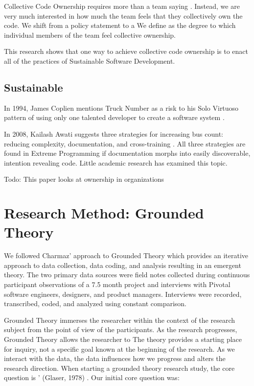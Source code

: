 Collective Code Ownership requires more than a team saying . Instead, we are very much interested in how much the team feels that they collectively own the code. We shift from a policy statement to a  We define  as the degree to which individual members of the team feel collective ownership.  

This research shows that one way to achieve collective code ownership is to enact all of the practices of Sustainable Software Development.

\subsection{Sustainable}

In 1994, James Coplien mentions Truck Number as a risk to his Solo Virtuoso pattern of using only one talented developer to create a software system \cite{Coplien1994}.

In 2008, Kailash Awati suggests three strategies for increasing bus count: reducing complexity, documentation, and cross-training \cite{AwatiBusFactor}. All three strategies are found in Extreme Programming if documentation morphs into easily discoverable, intention revealing code. Little academic research has examined this topic. 


Todo: This paper looks at ownership in organizations \cite{PierceOwnershipInOrganizations}
\section{Research Method: Grounded Theory}
\label{ResearchMethod}

We followed Charmaz' approach to Grounded Theory \cite{Charmaz} which provides an iterative approach to data collection, data coding, and analysis resulting in an emergent theory. The two primary data sources were field notes collected during continuous participant observations of a 7.5 month project and interviews with Pivotal software engineers, designers, and product managers. Interviews were recorded, transcribed, coded, and analyzed using constant comparison. 

Grounded Theory immerses the researcher within the context of the research subject from the point of view of the participants. As the research progresses, Grounded Theory allows the researcher to  The theory provides a starting place for inquiry, not a specific goal known at the beginning of the research. As we interact with the data, the data influences how we progress and alters the research direction. When starting a grounded theory research study, the core question is ' (Glaser, 1978) \cite{GlaserTheoreticalSensitivity}. Our initial core question was: 

